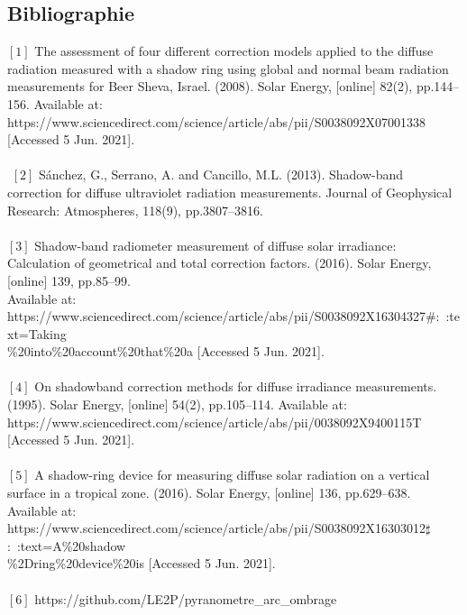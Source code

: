 \documentclass[12pt,a4paper]{article}
\begin{document}
\begin{flushleft}
\newpage

\section{Bibliographie}


$[1]$ The assessment of four different correction models applied to the diffuse radiation measured with a shadow ring using global and normal beam radiation measurements for Beer Sheva, Israel. (2008). Solar Energy, [online] 82(2), pp.144–156. Available at: https://www.sciencedirect.com/science/article/abs/pii/S0038092X07001338 [Accessed 5 Jun. 2021].\\
~\\
‌
$[2]$ Sánchez, G., Serrano, A. and Cancillo, M.L. (2013). Shadow-band correction for diffuse ultraviolet radiation measurements. Journal of Geophysical Research: Atmospheres, 118(9), pp.3807–3816.\\

‌~\\
$[3]$ Shadow-band radiometer measurement of diffuse solar irradiance: Calculation of geometrical and total correction factors. (2016). Solar Energy, [online] 139, pp.85–99.\\ 
Available at: https://www.sciencedirect.com/science/article/abs/pii/S0038092X16304327\#:~:text=Taking\\\%20into\%20account\%20that\%20a [Accessed 5 Jun. 2021].\\

‌~\\
$[4]$ On shadowband correction methods for diffuse irradiance measurements. (1995). Solar Energy, [online] 54(2), pp.105–114. Available at: https://www.sciencedirect.com/science/article/abs/pii/0038092X9400115T [Accessed 5 Jun. 2021].\\

‌~\\
$[5]$ A shadow-ring device for measuring diffuse solar radiation on a vertical surface in a tropical zone. (2016). Solar Energy, [online] 136, pp.629–638. Available at: https://www.sciencedirect.com/science/article/abs/pii/S0038092X16303012$\sharp$:~:text=A\%20shadow\\\%2Dring\%20device\%20is [Accessed 5 Jun. 2021].\\
‌~\\
$[6]$ https://github.com/LE2P/pyranometre\_arc\_ombrage

‌


\end{flushleft}






\end{document}
